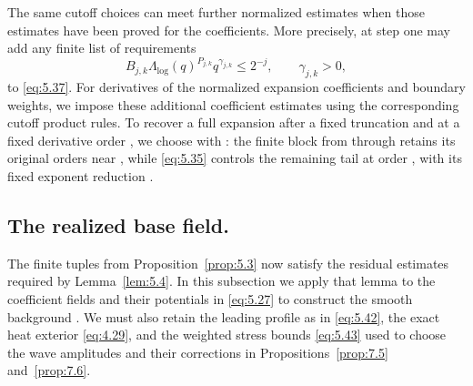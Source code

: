 The same cutoff choices can meet further normalized estimates when those estimates have been proved
for the coefficients. More precisely, at step  one may add any finite list of
requirements
\begin{equation}
 B_{j,k}\Lambda_{\log}(q)^{P_{j,k}}q^{\gamma_{j,k}}\leq2^{-j},
 \qquad \gamma_{j,k}>0,
 \tag{5.40}\label{eq:5.40}
\end{equation}
to \eqref{eq:5.37}. For derivatives of the normalized expansion coefficients and boundary weights,
we impose these additional coefficient estimates using the corresponding cutoff product rules. To
recover a full expansion after a fixed truncation  and at a fixed derivative
order , we choose
 with
: the finite block from
 through  retains its original orders near
, while \eqref{eq:5.35} controls the remaining tail at order
, with its fixed exponent reduction
.

%
\subsection{The realized base field.}\label{sec:5.5}
The finite tuples  from Proposition~\ref{prop:5.3} now satisfy
the residual estimates required by Lemma~\ref{lem:5.4}. In this subsection we apply that lemma to
the coefficient fields and their potentials  in \eqref{eq:5.27} to
construct the smooth background . We must also retain the leading
profile as in \eqref{eq:5.42}, the exact heat exterior \eqref{eq:4.29}, and the weighted stress bounds
\eqref{eq:5.43} used to choose the wave amplitudes and their corrections in Propositions~\ref{prop:7.5}
and~\ref{prop:7.6}.

